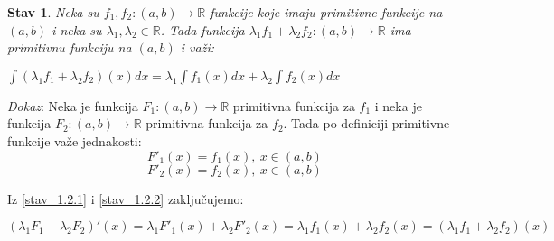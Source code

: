 \documentclass{article}
\newtheorem{stav}{Stav}[section]
\begin{document}
\begin{stavbox}
    \begin{stav}
        Neka su $f_1, f_2 : (a, b) \longrightarrow \mathbb{R}$
        funkcije koje imaju primitivne funkcije na $(a, b)$ i neka
        su $\lambda_1 , \lambda_2 \in \mathbb{R}$. Tada funkcija
        $\lambda_1 f_1 + \lambda_2 f_2 : (a, b) \longrightarrow
            \mathbb{R}$ ima primitivnu funkciju na $(a, b)$ i važi:\par
        $\int (\lambda_1 f_1 + \lambda_2 f_2)(x)dx = \lambda_1\int
            f_1(x) dx + \lambda_2\int f_2(x) dx$
    \end{stav}
\end{stavbox}
\setcounter{equation}{0}
\textit{Dokaz}: Neka je funkcija $F_1: (a, b) \longrightarrow \mathbb{R}$
primitivna funkcija za $f_1$ i neka je funkcija $F_2: (a, b)
    \longrightarrow \mathbb{R}$ primitivna funkcija za $f_2$.
Tada po definiciji primitivne funkcije važe jednakosti:
\begin{equation} \label{stav_1.2.1}
    F'_1(x) = f_1(x),\ x \in (a, b)
\end{equation}
\begin{equation} \label{stav_1.2.2}
    F'_2(x) = f_2(x),\ x \in (a, b)
\end{equation}

Iz \eqref{stav_1.2.1} i \eqref{stav_1.2.2} zaključujemo:

\begin{equation} \label{stav_1.2.3}
    (\lambda_1 F_1 + \lambda_2 F_2)'(x) =
    \lambda_1 F'_1(x) + \lambda_2 F'_2(x) =
    \lambda_1 f_1(x) + \lambda_2 f_2(x) =
    (\lambda_1 f_1 + \lambda_2 f_2)(x)
\end{equation}
\end{document}

